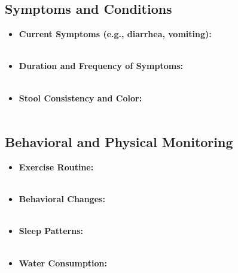\documentclass{article}
\begin{document}
\subsection*{Symptoms and Conditions}
\begin{itemize}
    \item \textbf{Current Symptoms (e.g., diarrhea, vomiting):} \\
    \underline{\hspace{\textwidth}} \\
    \underline{\hspace{\textwidth}}
    \item \textbf{Duration and Frequency of Symptoms:} \\
    \underline{\hspace{\textwidth}} \\
    \underline{\hspace{\textwidth}}
    \item \textbf{Stool Consistency and Color:} \\
    \underline{\hspace{\textwidth}} \\
    \underline{\hspace{\textwidth}}
\end{itemize}

\subsection*{Behavioral and Physical Monitoring}
\begin{itemize}
    \item \textbf{Exercise Routine:} \\
    \underline{\hspace{\textwidth}} \\
    \underline{\hspace{\textwidth}}
    \item \textbf{Behavioral Changes:} \\
    \underline{\hspace{\textwidth}} \\
    \underline{\hspace{\textwidth}}
    \item \textbf{Sleep Patterns:} \\
    \underline{\hspace{\textwidth}} \\
    \underline{\hspace{\textwidth}}
    \item \textbf{Water Consumption:} \\
    \underline{\hspace{\textwidth}} \\
    \underline{\hspace{\textwidth}}
\end{itemize}
\end{document}
